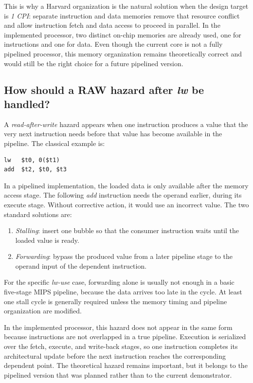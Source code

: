 \documentclass[a4paper,11pt]{scrartcl}
\begin{document}
This is why a Harvard organization is the natural solution when the design target is \emph{1 CPI}: separate instruction and data memories remove that resource conflict and allow instruction fetch and data access to proceed in parallel. In the implemented processor, two distinct on-chip memories are already used, one for instructions and one for data. Even though the current core is not a fully pipelined processor, this memory organization remains theoretically correct and would still be the right choice for a future pipelined version.
\subsection{How should a RAW hazard after \emph{lw} be handled?}
\label{sec:orgb4017d7}

A \emph{read-after-write} hazard appears when one instruction produces a value that the very next instruction needs before that value has become available in the pipeline. The classical example is:

\begin{verbatim}
lw   $t0, 0($t1)
add  $t2, $t0, $t3
\end{verbatim}

In a pipelined implementation, the loaded data is only available after the memory access stage. The following \emph{add} instruction needs the operand earlier, during its execute stage. Without corrective action, it would use an incorrect value. The two standard solutions are:

\begin{enumerate}
\item \emph{Stalling}: insert one bubble so that the consumer instruction waits until the loaded value is ready.
\item \emph{Forwarding}: bypass the produced value from a later pipeline stage to the operand input of the dependent instruction.
\end{enumerate}

For the specific \emph{lw-use} case, forwarding alone is usually not enough in a basic five-stage MIPS pipeline, because the data arrives too late in the cycle. At least one stall cycle is generally required unless the memory timing and pipeline organization are modified.

In the implemented processor, this hazard does not appear in the same form because instructions are not overlapped in a true pipeline. Execution is serialized over the fetch, execute, and write-back stages, so one instruction completes its architectural update before the next instruction reaches the corresponding dependent point. The theoretical hazard remains important, but it belongs to the pipelined version that was planned rather than to the current demonstrator.
\end{document}
